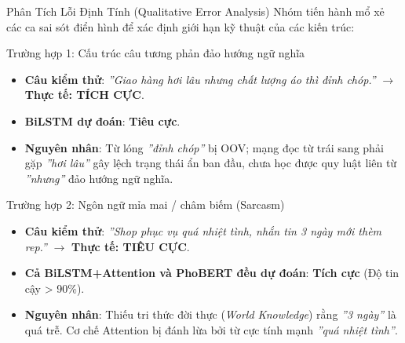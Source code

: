 \documentclass[aspectratio=169, 10pt]{beamer}
\begin{document}
\begin{frame}{Phân Tích Lỗi Định Tính (Qualitative Error Analysis)}
  \fontsize{7.5}{9.5}\selectfont
  Nhóm tiến hành mổ xẻ các ca sai sót điển hình để xác định giới hạn kỹ thuật của các kiến trúc:

  \vspace{0.15cm}
  \begin{block}{Trường hợp 1: Cấu trúc câu tương phản đảo hướng ngữ nghĩa}
    \begin{itemize}
      \item \textbf{Câu kiểm thử}: \textit{''Giao hàng hơi lâu nhưng chất lượng áo thì đỉnh chóp.''} $\to$ \textbf{Thực tế: TÍCH CỰC}.
      \item \textbf{BiLSTM dự đoán}: \textbf{Tiêu cực}.
      \item \textbf{Nguyên nhân}: Từ lóng \textit{''đỉnh chóp''} bị OOV; mạng đọc từ trái sang phải gặp \textit{''hơi lâu''} gây lệch trạng thái ẩn ban đầu, chưa học được quy luật liên từ \textit{''nhưng''} đảo hướng ngữ nghĩa.
    \end{itemize}
  \end{block}

  \begin{alertblock}{Trường hợp 2: Ngôn ngữ mỉa mai / châm biếm (Sarcasm)}
    \begin{itemize}
      \item \textbf{Câu kiểm thử}: \textit{''Shop phục vụ quá nhiệt tình, nhắn tin 3 ngày mới thèm rep.''} $\to$ \textbf{Thực tế: TIÊU CỰC}.
      \item \textbf{Cả BiLSTM+Attention và PhoBERT đều dự đoán}: \textbf{Tích cực} (Độ tin cậy > 90\%).
      \item \textbf{Nguyên nhân}: Thiếu tri thức đời thực (\textit{World Knowledge}) rằng \textit{''3 ngày''} là quá trễ. Cơ chế Attention bị đánh lừa bởi từ cực tính mạnh \textit{''quá nhiệt tình''}.
    \end{itemize}
  \end{alertblock}
\end{frame}
\end{document}

